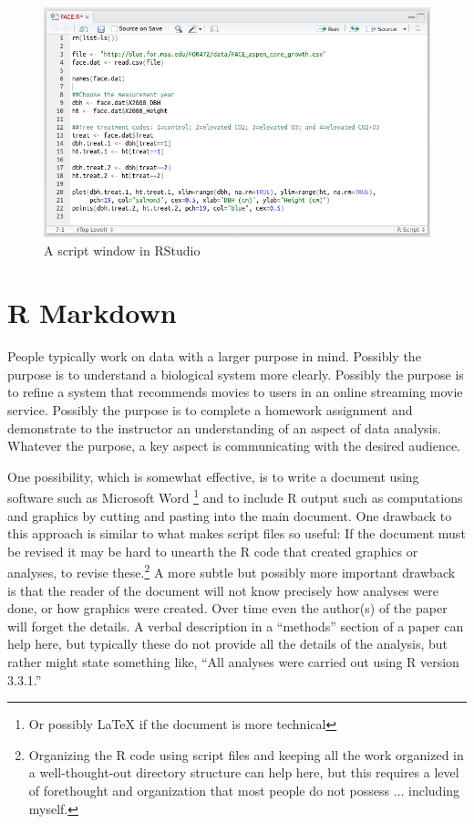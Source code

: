 \documentclass[]{krantz}
\begin{document}
\begin{figure}

{\centering \includegraphics[width=1\linewidth]{03-scripts/03-images/FACE-script-screenshot} 

}

\caption{A script window in RStudio}\label{fig:script}
\end{figure}

\hypertarget{r-markdown}{%
\section{R Markdown}\label{r-markdown}}

People typically work on data with a larger purpose in mind. Possibly the purpose is to understand a biological system more clearly. Possibly the purpose is to refine a system that recommends movies to users in an online streaming movie service. Possibly the purpose is to complete a homework assignment and demonstrate to the instructor an understanding of an aspect of data analysis. Whatever the purpose, a key aspect is communicating with the desired audience.

One possibility, which is somewhat effective, is to write a document using software such as Microsoft Word \footnote{Or possibly LaTeX if the document is more technical} and to include R output such as computations and graphics by cutting and pasting into the main document. One drawback to this approach is similar to what makes script files so useful: If the document must be revised it may be hard to unearth the R code that created graphics or analyses, to revise these.\footnote{Organizing the R code using script files and keeping all the work organized in a well-thought-out directory structure can help here, but this requires a level of forethought and organization that most people do not possess \(\ldots\) including myself.} A more subtle but possibly more important drawback is that the reader of the document will not know precisely how analyses were done, or how graphics were created. Over time even the author(s) of the paper will forget the details. A verbal description in a ``methods'' section of a paper can help here, but typically these do not provide all the details of the analysis, but rather might state something like, ``All analyses were carried out using R version 3.3.1.''
\end{document}

